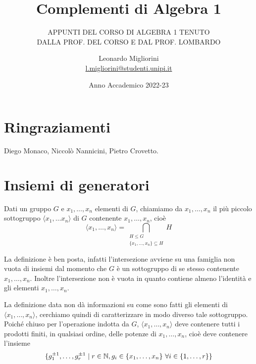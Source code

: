 \documentclass[11pt]{scrartcl}
\begin{document}
\title{Complementi di Algebra 1}
\subtitle{\large\normalfont\rmfamily\scshape APPUNTI DEL CORSO DI ALGEBRA 1 TENUTO\\ DALLA PROF. DEL CORSO E DAL PROF. LOMBARDO}
\author{Leonardo Migliorini \\ \textnormal{\href{l.migliorini@studenti.unipi.it}{l.migliorini@studenti.unipi.it}}}
\date{Anno Accademico 2022-23}
\maketitle
\newpage

\tableofcontents
\eject
\newpage

\section*{Ringraziamenti}

Diego Monaco, Niccolò Nannicini, Pietro Crovetto.

\newpage
\section{Insiemi di generatori}

\begin{definition}
    Dati un gruppo $G$ e $x_1, \ldots, x_n$ elementi di $G$, chiamiamo  da $x_1, \ldots, x_n$ il più piccolo sottogruppo $\langle x_1, \ldots x_n
    \rangle$ di $G$ contenente $x_1, \ldots, x_n$, cioè \[\langle x_1, \ldots, x_n\rangle =
    \bigcap_{\substack{H\leqslant G\\ \{x_1, \ldots, x_n\} \subseteq H}} H\] 
\end{definition}

\begin{remark}
    La definizione è ben posta, infatti l'intersezione avviene su una 
    famiglia non vuota di insiemi dal momento che $G$ è un sottogruppo di 
    se stesso contenente $x_1, \ldots, x_n$. Inoltre l'intersezione non è vuota in 
    quanto contiene almeno l'identità e gli elementi $x_1, \ldots, x_n$.
\end{remark}

La definizione data non dà informazioni su come sono fatti gli elementi di 
$\langle x_1, \ldots, x_n\rangle$, cerchiamo quindi di caratterizzare in modo
diverso tale sottogruppo. Poiché chiuso per l'operazione indotta da $G$, $\langle x_1, \ldots, x_n\rangle$
deve contenere tutti i prodotti finiti, in qualsiasi ordine, delle potenze di
$x_1, \ldots, x_n$, cioè deve contenere l'insieme 
\[\{g_1^{\pm 1}, \ldots, g_r^{\pm 1}\mid r \in \mathbb N, g_i \in \{x_1, \ldots, x_n\}
~\forall i \in \{1, \ldots, r\}\}\]
\end{document}
